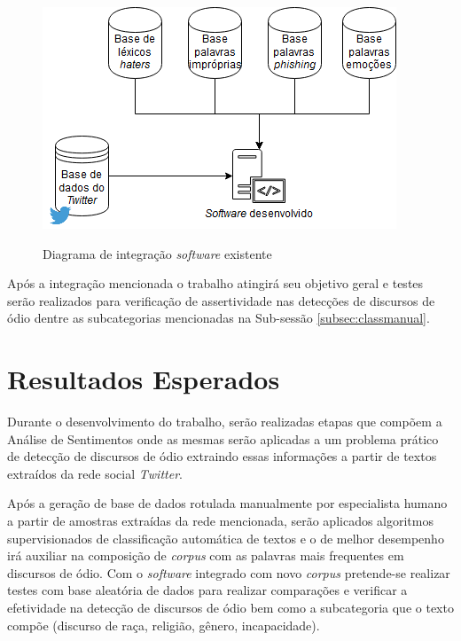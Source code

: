 \begin{figure}[!h]
\centering 
\caption{Diagrama de integração \textit{software} existente}
\includegraphics[scale=0.6]{imagens/implementacao.png}
\label{fig:implementacao}
\end{figure}
Após a integração mencionada o trabalho atingirá seu objetivo geral e testes serão realizados para verificação de assertividade nas detecções de discursos de ódio dentre as subcategorias mencionadas na Sub-sessão \ref{subsec:classmanual}.

\section{Resultados Esperados}
Durante o desenvolvimento do trabalho, serão realizadas etapas que compõem a Análise de Sentimentos onde as mesmas serão aplicadas a um problema prático de detecção de discursos de ódio extraindo essas informações a partir de textos extraídos da rede social \textit{Twitter}.

Após a geração de base de dados rotulada manualmente por especialista humano a partir de amostras extraídas da rede mencionada, serão aplicados algoritmos supervisionados de classificação automática de textos e o de melhor desempenho irá auxiliar na composição de \textit{corpus} com as palavras mais frequentes em discursos de ódio. Com o \textit{software} integrado com novo \textit{corpus} pretende-se realizar testes com base aleatória de dados para realizar comparações e verificar a efetividade na detecção de discursos de ódio bem como a subcategoria que o texto compõe (discurso de raça, religião, gênero, incapacidade).